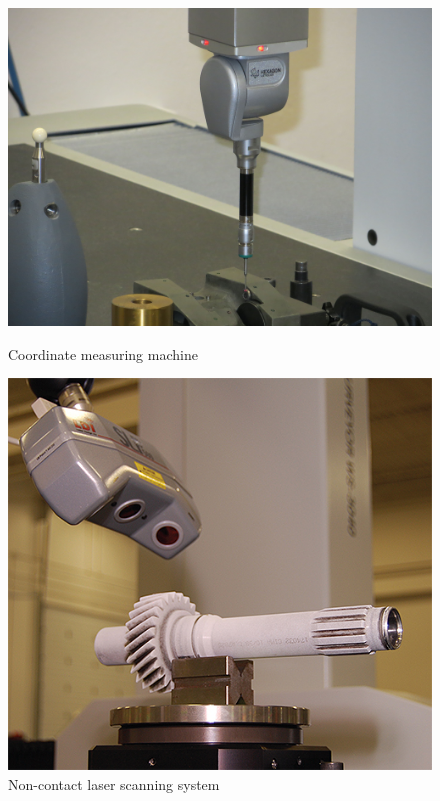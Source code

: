 \documentclass[a4paper, twoside, 11pt]{report}
\begin{document}
\begin{figure}[h]
  \centering
  \begin{minipage}[b]{0.4\textwidth}
    \includegraphics[width=\textwidth]{scanningMachine1}
    \caption{Coordinate measuring machine}
  \end{minipage}
  \hfill
  \begin{minipage}[t]{0.4\textwidth}
    \includegraphics[width=\textwidth]{scanningMachine2}
    \caption{Non-contact laser scanning system}
  \end{minipage}
\end{figure}
%
\end{document}
